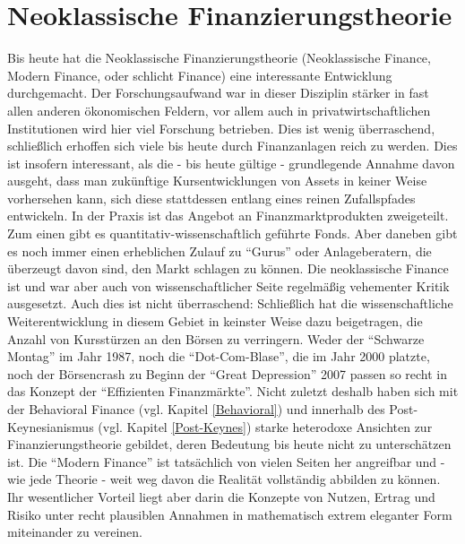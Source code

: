 %
%
%

\chapter{Neoklassische Finanzierungstheorie}
\label{Finance}



Bis heute hat die Neoklassische Finanzierungstheorie (Neoklassische Finance, Modern Finance, oder schlicht Finance) eine interessante Entwicklung durchgemacht. Der Forschungsaufwand war in dieser Disziplin stärker in fast allen anderen ökonomischen Feldern, vor allem auch in privatwirtschaftlichen Institutionen wird hier viel Forschung betrieben. Dies ist wenig überraschend, schließlich erhoffen sich viele bis heute durch Finanzanlagen reich zu werden. Dies ist insofern interessant, als die - bis heute gültige - grundlegende Annahme davon ausgeht, dass man zukünftige Kursentwicklungen von Assets in keiner Weise vorhersehen kann, sich diese stattdessen entlang eines reinen Zufallspfades entwickeln. In der Praxis ist das Angebot an Finanzmarktprodukten zweigeteilt. Zum einen gibt es quantitativ-wissenschaftlich geführte Fonds. Aber daneben gibt es noch immer einen erheblichen Zulauf zu "`Gurus"' oder Anlageberatern, die überzeugt davon sind, den Markt schlagen zu können. Die neoklassische Finance ist und war aber auch von wissenschaftlicher Seite regelmäßig vehementer Kritik ausgesetzt. Auch dies ist nicht überraschend: Schließlich hat die wissenschaftliche Weiterentwicklung in diesem Gebiet in keinster Weise dazu beigetragen, die Anzahl von Kursstürzen an den Börsen zu verringern. Weder der "`Schwarze Montag"' im Jahr 1987, noch die "`Dot-Com-Blase"', die im Jahr 2000 platzte, noch der Börsencrash zu Beginn der "`Great Depression"' 2007 passen so recht in das Konzept der "`Effizienten Finanzmärkte"'. Nicht zuletzt deshalb haben sich mit der Behavioral Finance (vgl. Kapitel \ref{Behavioral}) und innerhalb des Post-Keynesianismus (vgl. Kapitel \ref{Post-Keynes}) starke heterodoxe Ansichten zur Finanzierungstheorie gebildet, deren Bedeutung bis heute nicht zu unterschätzen ist. Die "`Modern Finance"' ist tatsächlich von vielen Seiten her angreifbar und - wie jede Theorie - weit weg davon die Realität vollständig abbilden zu können. Ihr wesentlicher Vorteil liegt aber darin die Konzepte von Nutzen, Ertrag und Risiko unter recht plausiblen Annahmen in mathematisch extrem eleganter Form miteinander zu vereinen. 


